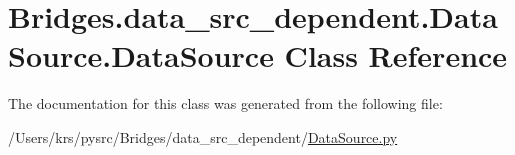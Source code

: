 \hypertarget{class_bridges_1_1data__src__dependent_1_1_data_source_1_1_data_source}{}\section{Bridges.\+data\+\_\+src\+\_\+dependent.\+Data\+Source.\+Data\+Source Class Reference}
\label{class_bridges_1_1data__src__dependent_1_1_data_source_1_1_data_source}


The documentation for this class was generated from the following file\+:\begin{DoxyCompactItemize}
\item 
/\+Users/krs/pysrc/\+Bridges/data\+\_\+src\+\_\+dependent/\hyperlink{_data_source_8py}{Data\+Source.\+py}\end{DoxyCompactItemize}
